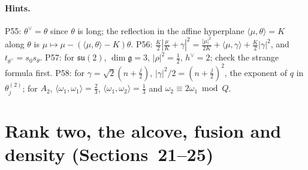 \documentclass[11pt]{article}
\begin{document}
\paragraph{Hints.} P55: $\theta^\vee = \theta$ since
$\theta$ is long; the reflection in the affine hyperplane
$\langle\mu,\theta\rangle = K$ along $\theta$ is $\mu\mapsto\mu-(\langle\mu,\theta\rangle-K)\theta$. P56: $\tfrac K2|\tfrac\mu K+\gamma|^2 = \tfrac{|\mu|^2}{2K}+\langle\mu,\gamma\rangle+\tfrac K2|\gamma|^2$,
and $t_{\theta^\vee} = s_0s_\theta$. P57: for
$\mathfrak{su}(2)$, $\dim\mathfrak g = 3$, $|\rho|^2 = \tfrac12$,
$h^\vee = 2$; check the strange formula first. P58: for
$\gamma = \sqrt2(n+\tfrac j2)$, $|\gamma|^2/2 = (n+\tfrac j2)^2$, the
exponent of $q$ in $\theta^{(2)}_j$; for $A_2$,
$\langle\omega_1,\omega_1\rangle = \tfrac23$, $\langle\omega_1,\omega_2\rangle = \tfrac13$
and $\omega_2\equiv2\omega_1 \bmod Q$.

\section{Rank two, the alcove, fusion and density (Sections~21--25)}
\end{document}
